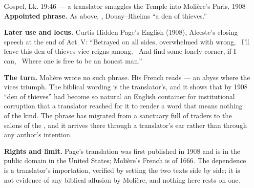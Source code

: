 \begin{afterlife}{Gospel, Lk. 19:46 --- a translator smuggles the Temple into Molière's Paris, 1908}
\textbf{Appointed phrase.} As above, , Douay--Rheims
``a den of thieves.''

\textbf{Later use and locus.} Curtis Hidden Page's English 
(1908), Alceste's closing speech at the end of Act~V: ``Betrayed on all sides,
overwhelmed with wrong, \textbar\ I'll leave this den of thieves vice reigns
among, \textbar\ And find some lonely corner, if I can, \textbar\ Where one is
free to be an honest man.''

\textbf{The turn.} Molière wrote no such phrase. His French reads
 --- an abyss where the vices triumph.
The biblical wording is the translator's, and it shows that by 1908 ``den of thieves'' had become so natural an
English container for institutional corruption that a translator reached for
it to render a word that means nothing of the kind. The phrase has migrated
from a sanctuary full of traders to the salons of the ,
and it arrives there through a translator's ear rather than through any
author's intention.

\textbf{Rights and limit.} Page's translation was first published in 1908 and
is in the public domain in the United States; Molière's French is of 1666. The
dependence is a translator's importation, verified by setting the two texts
side by side; it is not evidence of any biblical allusion by Molière, and
nothing here rests on one.
\end{afterlife}
